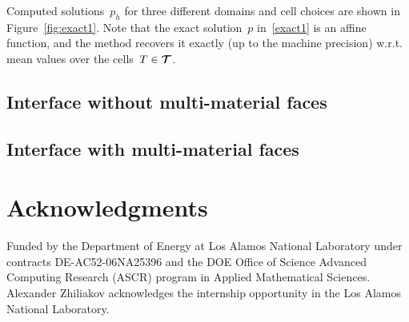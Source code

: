 Computed solutions~$p_h$ for three different domains and cell choices are shown in Figure~\ref{fig:exact1}. Note that the exact solution~$p$ in~\eqref{exact1} is an affine function, and the method recovers it exactly (up to the machine precision) w.r.t. mean values over the cells~$T \in {\boldsymbol{\mathbf{\mathcal T}}}$. 


\subsection{Interface without multi-material faces}


\subsection{Interface with multi-material faces}


\section*{Acknowledgments}

Funded by the Department of Energy at Los Alamos National Laboratory
under contracts DE-AC52-06NA25396 and the DOE Office of Science
Advanced Computing Research (ASCR) program in Applied Mathematical
Sciences. Alexander Zhiliakov acknowledges the internship opportunity in the Los Alamos National Laboratory.




